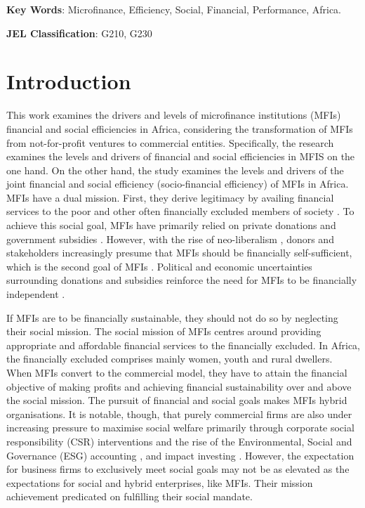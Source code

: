 \documentclass[a4paper, nobind]{templates/ociamthesis}
\begin{document}
\vspace{10mm}

\textbf{Key Words}: Microfinance, Efficiency, Social, Financial, Performance, Africa.

\vspace{5mm}

\textbf{JEL Classification}: G210, G230

\newpage

\hypertarget{introduction}{%
\section{Introduction}\label{introduction}}

This work examines the drivers and levels of microfinance institutions (MFIs) financial and social efficiencies in Africa, considering the transformation of MFIs from not-for-profit ventures to commercial entities. Specifically, the research examines the levels and drivers of financial and social efficiencies in MFIS on the one hand. On the other hand, the study examines the levels and drivers of the joint financial and social efficiency (socio-financial efficiency) of MFIs in Africa. MFIs have a dual mission. First, they derive legitimacy by availing financial services to the poor and other often financially excluded members of society \autocite{marconatto2016going}. To achieve this social goal, MFIs have primarily relied on private donations and government subsidies \autocite{d2017ngos}. However, with the rise of neo-liberalism \autocite{bateman2010doesn}, donors and stakeholders increasingly presume that MFIs should be financially self-sufficient, which is the second goal of MFIs \autocite{beisland2019commercialization}. Political and economic uncertainties surrounding donations and subsidies reinforce the need for MFIs to be financially independent \autocite{armendariz2011mission,garmaise2013cheap}.

If MFIs are to be financially sustainable, they should not do so by neglecting their social mission. The social mission of MFIs centres around providing appropriate and affordable financial services to the financially excluded. In Africa, the financially excluded comprises mainly women, youth and rural dwellers. When MFIs convert to the commercial model, they have to attain the financial objective of making profits and achieving financial sustainability over and above the social mission. The pursuit of financial and social goals makes MFIs hybrid organisations. It is notable, though, that purely commercial firms are also under increasing pressure to maximise social welfare primarily through corporate social responsibility (CSR) interventions and the rise of the Environmental, Social and Governance (ESG) accounting \autocite{van2016esg}, and impact investing \autocite{barber2021impact}. However, the expectation for business firms to exclusively meet social goals may not be as elevated as the expectations for social and hybrid enterprises, like MFIs. Their mission achievement predicated on fulfilling their social mandate.
\end{document}
